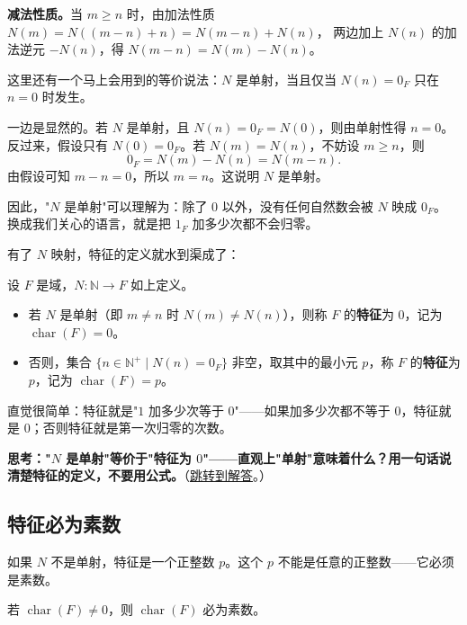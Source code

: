 \textbf{减法性质。}当 $m \geq n$ 时，由加法性质 $N(m) = N((m-n)+n) = N(m-n) + N(n)$，
两边加上 $N(n)$ 的加法逆元 $-N(n)$，得 $N(m-n) = N(m) - N(n)$。

这里还有一个马上会用到的等价说法：$N$ 是单射，当且仅当 $N(n)=0_F$ 只在 $n=0$ 时发生。

一边是显然的。若 $N$ 是单射，且 $N(n)=0_F=N(0)$，则由单射性得 $n=0$。
反过来，假设只有 $N(0)=0_F$。若 $N(m)=N(n)$，不妨设 $m\geq n$，则
\[
0_F=N(m)-N(n)=N(m-n).
\]
由假设可知 $m-n=0$，所以 $m=n$。这说明 $N$ 是单射。

因此，"$N$ 是单射"可以理解为：除了 $0$ 以外，没有任何自然数会被 $N$ 映成 $0_F$。
换成我们关心的语言，就是把 $1_F$ 加多少次都不会归零。

有了 $N$ 映射，特征的定义就水到渠成了：

\begin{definition}[域的特征]\label{def:characteristic}
设 $F$ 是域，$N: \mathbb{N} \to F$ 如上定义。
\begin{itemize}
    \item 若 $N$ 是单射（即 $m \neq n$ 时 $N(m) \neq N(n)$），则称 $F$ 的\textbf{特征}为 $0$，记为 $\operatorname{char}(F) = 0$。
    \item 否则，集合 $\{n \in \mathbb{N}^+ \mid N(n) = 0_F\}$ 非空，取其中的最小元 $p$，称 $F$ 的\textbf{特征}为 $p$，记为 $\operatorname{char}(F) = p$。
\end{itemize}
\end{definition}

直觉很简单：特征就是"$1$ 加多少次等于 $0$"——如果加多少次都不等于 $0$，特征就是 $0$；否则特征就是第一次归零的次数。

\hypertarget{q:char-definition-intuition}{}
\medskip
\noindent\textbf{思考："$N$ 是单射"等价于"特征为 $0$"——直观上"单射"意味着什么？用一句话说清楚特征的定义，不要用公式。}（\hyperlink{ans:char-definition-intuition}{跳转到解答}。）
\medskip

\subsection{特征必为素数}

如果 $N$ 不是单射，特征是一个正整数 $p$。这个 $p$ 不能是任意的正整数——它必须是素数。

\begin{proposition}[特征必为素数]\label{prop:char-prime}
若 $\operatorname{char}(F) \neq 0$，则 $\operatorname{char}(F)$ 必为素数。
\end{proposition}

